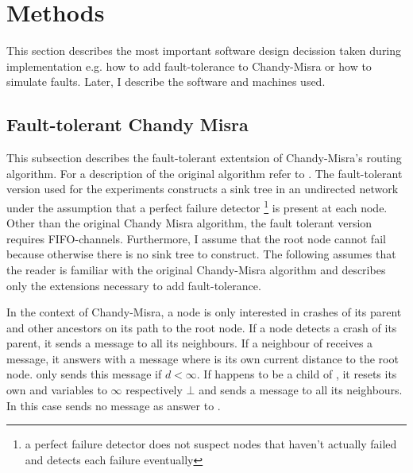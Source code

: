 \section{Methods}
\label{sec:methods}
This section describes the most important software design decission taken during implementation e.g. how to add fault-tolerance to Chandy-Misra or how to simulate faults.
Later, I describe the software and machines used.

\subsection {Fault-tolerant Chandy Misra}
\label{ssec:fault-tolerant-chandy-misra}
This subsection describes the fault-tolerant extentsion of Chandy-Misra's routing algorithm. 
For a description of the original algorithm refer to \cite[page 56]{Fokkink:2018}.
The fault-tolerant version used for the experiments constructs a sink tree in an undirected network under the assumption that a perfect failure detector \footnote{a perfect failure detector does not suspect nodes that haven't actually failed and detects each failure eventually} is present at each node. 
Other than the original Chandy Misra algorithm, the fault tolerant version requires FIFO-channels.
Furthermore, I assume that the root node cannot fail because otherwise there is no sink tree to construct. 
The following assumes that the reader is familiar with the original Chandy-Misra algorithm and describes only the extensions necessary to add fault-tolerance.

In the context of Chandy-Misra, a node is only interested in crashes of its parent and other ancestors on its path to the root node.
If a node  detects a crash of its parent, it sends a  message to all its neighbours. 
If a neighbour  of  receives a  message, it answers with a  message where  is its own current distance to the root node. 
 only sends this message if $d < \infty $.
If  happens to be a child of , it resets its own  and  variables to $\infty$ respectively $\bot$ and sends a  message to all its neighbours.
In this case  sends no  message as answer to .

